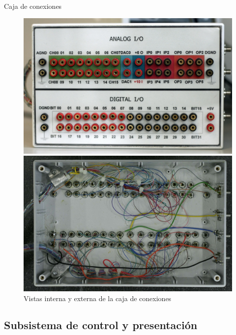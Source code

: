\documentclass[utf8, compress]			{beamer}
\begin{document}
\begin{frame}{Caja de conexiones}
    \begin{figure}
	\hfill
	\begin{minipage}[top][\exterior][c]{\interior}
	    \includegraphics[angle=90]{exterior.jpg}
	\end{minipage}
	\hspace{1.5em}
	\begin{minipage}[top][\exterior][c]{\interior}
	    \includegraphics[angle=90]{interior.jpg}
	\end{minipage}
	\hfill
	\caption{Vistas interna y externa de la caja de conexiones}
	\label{fig:connectionbox}
    \end{figure}
\end{frame}


\subsection{Subsistema de control y presentación}
\end{document}
